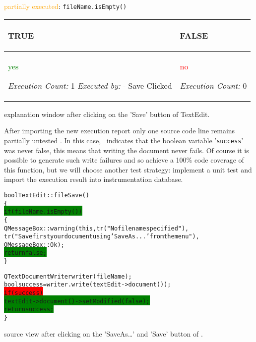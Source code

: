 \begin{figureenv}
  \scriptsize
  \textcolor{orange}{partially executed}: \texttt{fileName.isEmpty()} \par
\hspace{1cm}
\begin{tabularx}{9cm}{||X||X||} \hline\hline
  \begin{center}\textbf{TRUE}\end{center}          & \begin{center}{\textbf{FALSE}}\end{center}      \\ \hline\hline
  \centerline{\textcolor{green}{yes}} 
  \textit{Execution Count:} 1         \newline
  \textit{Executed by:}               \newline
  \hspace{.4cm}- Save Clicked         &

                                        \centerline{\textcolor{red}{no}} 
                                        \textit{Execution Count:} 0      
                                                                         \\ \hline\hline
\end{tabularx}
\caption{{\CoverageBrowser} explanation window after clicking on the 'Save' button of TextEdit.}
\label{lst:src3}
\end{figureenv}

After importing the new execution report only one source code line remains
partially untested . In this case, \CoverageBrowser\ indicates
that the boolean variable '\verb$success$' was never false, this means that writing
the document never fails. Of course it is possible to generate such write failures
and so achieve a 100\% code coverage of this function, but we will choose
another test strategy: implement a unit test and import the execution result
into {\TextEdit} instrumentation database.

\begin{figureenv}
  \scriptsize
\begin{alltt}
bool TextEdit::fileSave()
\{
\colorbox{green}{  if (fileName.isEmpty())}
  \{
    QMessageBox::warning(this,tr("No file name specified"),
      tr("Save first your document using 'Save As...' from the menu"),
      QMessageBox::Ok );
\colorbox{green}{    return false;}
   \}

  QTextDocumentWriter writer(fileName);
  bool success = writer.write(textEdit->document());
\colorbox{red}{  if (success)}
\colorbox{green}{     textEdit->document()->setModified(false);}
\colorbox{green}{  return success;}
\}
\end{alltt}
\caption{{\CoverageBrowser} source view  after clicking on the 'SaveAs\ldots' and 'Save' button of {\TextEdit}.}
\label{lst:src4}
\end{figureenv}


